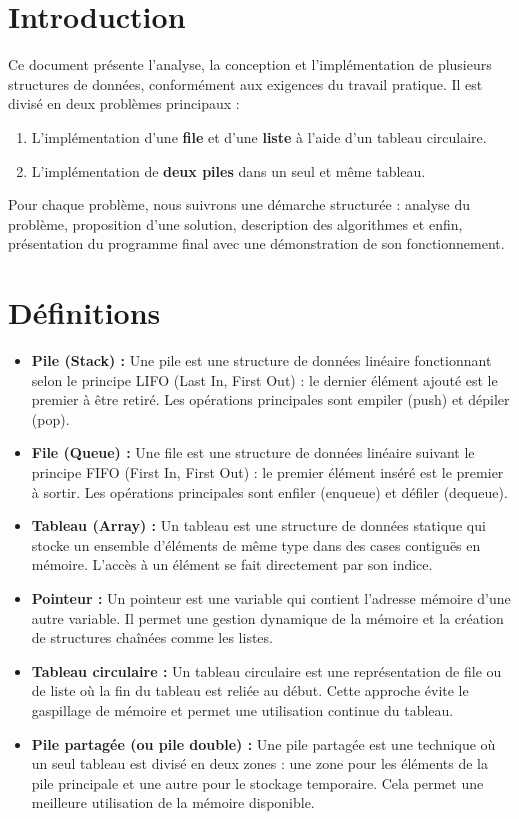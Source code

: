 \documentclass[a4paper, 11pt]{article}
\begin{document}

\tableofcontents
\newpage
\section{Introduction}

Ce document présente l'analyse, la conception et l'implémentation de plusieurs structures de données, conformément aux exigences du travail pratique. Il est divisé en deux problèmes principaux :
\begin{enumerate}
    \item L'implémentation d'une \textbf{file} et d'une \textbf{liste} à l'aide d'un tableau circulaire.
    \item L'implémentation de \textbf{deux piles} dans un seul et même tableau.
\end{enumerate}
Pour chaque problème, nous suivrons une démarche structurée : analyse du problème, proposition d'une solution, description des algorithmes et enfin, présentation du programme final avec une démonstration de son fonctionnement.

\section{Définitions}
\vspace{0.5cm}
\begin{itemize}
\item\textbf{Pile (Stack) :}
Une pile est une structure de données linéaire fonctionnant selon le principe LIFO (Last In, First Out) : le dernier élément ajouté est le premier à être retiré. Les opérations principales sont empiler (push) et dépiler (pop).

\item\textbf{File (Queue) :}
Une file est une structure de données linéaire suivant le principe FIFO (First In, First Out) : le premier élément inséré est le premier à sortir. Les opérations principales sont enfiler (enqueue) et défiler (dequeue).

\item\textbf{Tableau (Array) :}
Un tableau est une structure de données statique qui stocke un ensemble d’éléments de même type dans des cases contiguës en mémoire. L’accès à un élément se fait directement par son indice.

\item\textbf{Pointeur :}
Un pointeur est une variable qui contient l’adresse mémoire d’une autre variable. Il permet une gestion dynamique de la mémoire et la création de structures chaînées comme les listes.

\item\textbf{Tableau circulaire :}
Un tableau circulaire est une représentation de file ou de liste où la fin du tableau est reliée au début. Cette approche évite le gaspillage de mémoire et permet une utilisation continue du tableau.

\item\textbf{Pile partagée (ou pile double) :}
Une pile partagée est une technique où un seul tableau est divisé en deux zones : une zone pour les éléments de la pile principale et une autre pour le stockage temporaire. Cela permet une meilleure utilisation de la mémoire disponible.
\end{itemize}
\end{document}
